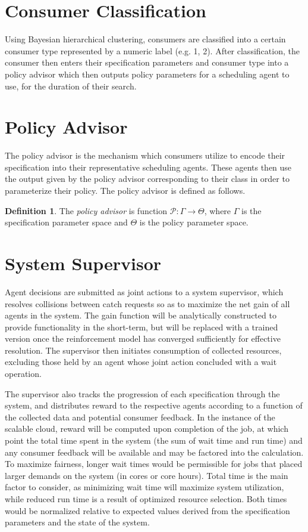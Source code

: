 \documentclass{article}
\theoremstyle{definition}
\newtheorem{definition}{Definition}[section]
\theoremstyle{remark}
\begin{document}
	\section{Consumer Classification}
	Using Bayesian hierarchical clustering, consumers are classified into a certain consumer type represented by a
    numeric label (e.g. 1, 2). After classification, the consumer then enters their specification parameters and
    consumer type into a policy advisor which then outputs policy parameters for a scheduling agent to use, for
    the duration of their search.
	
	\section{Policy Advisor}
	The policy advisor is the mechanism which consumers utilize to encode their specification into their
    representative scheduling agents. These agents then use the output given by the policy advisor corresponding
    to their class in order to parameterize their policy. The policy advisor is defined as follows.

    \begin{definition}
        The \emph{policy advisor} is function $\mathcal{P}: \Gamma \rightarrow \Theta$, where $\Gamma$ is the specification
		parameter space and $\Theta$ is the policy parameter space.
    \end{definition}

	\section{System Supervisor}
	
	\indent
	
	Agent decisions are submitted as joint actions to a system supervisor, which resolves collisions between catch requests so as to maximize the net gain of all agents in the system. The gain function will be analytically constructed to provide functionality in the short-term, but will be replaced with a trained version once the reinforcement model has converged sufficiently for effective resolution. The supervisor then initiates consumption of collected resources, excluding those held by an agent whose joint action concluded with a wait operation.
	
	The supervisor also tracks the progression of each specification through the system, and distributes reward to the respective agents according to a function of the collected data and potential consumer feedback. In the instance of the scalable cloud, reward will be computed upon completion of the job, at which point the total time spent in the system (the sum of wait time and run time) and any consumer feedback will be available and may be factored into the calculation. To maximize fairness, longer wait times would be permissible for jobs that placed larger demands on the system (in cores or core hours). Total time is the main factor to consider, as minimizing wait time will maximize system utilization, while reduced run time is a result of optimized resource selection. Both times would be normalized relative to expected values derived from the specification parameters and the state of the system.
	
\end{document}
